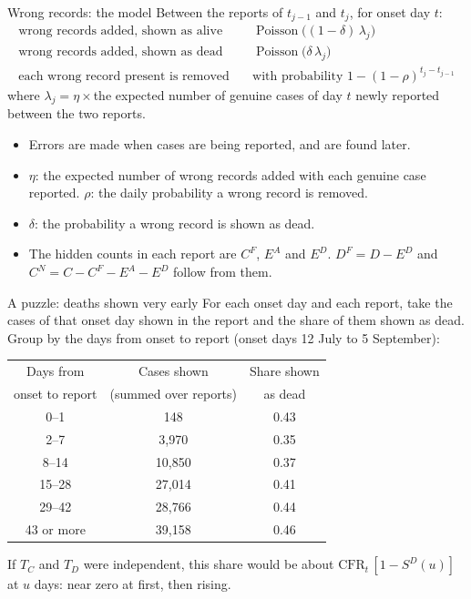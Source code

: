 \documentclass[aspectratio=169,9pt]{beamer}
\newcommand{\cfr}{\mathrm{CFR}}
\begin{document}
\begin{frame}{Wrong records: the model}
Between the reports of $t_{j-1}$ and $t_j$, for onset day $t$:
\begin{align*}
\text{wrong records added, shown as alive}\quad & \operatorname{Poisson}\bigl((1-\delta)\,\lambda_j\bigr)\\[3pt]
\text{wrong records added, shown as dead}\quad & \operatorname{Poisson}\bigl(\delta\,\lambda_j\bigr)\\[3pt]
\text{each wrong record present is removed}\quad & \text{with probability }1-(1-\rho)^{t_j-t_{j-1}}
\end{align*}
where $\lambda_j=\eta\times{}$the expected number of genuine cases of day $t$
newly reported between the two reports.

\bigskip
\begin{itemize}
\setlength{\itemsep}{0.6em}
\item Errors are made when cases are being reported, and are found later.
\item $\eta$: the expected number of wrong records added with each genuine
case reported. $\rho$: the daily probability a wrong record is removed.
\item $\delta$: the probability a wrong record is shown as dead.
\item The hidden counts in each report are $C^{F}$, $E^{A}$ and $E^{D}$.
$D^{F}=D-E^{D}$ and $C^{N}=C-C^{F}-E^{A}-E^{D}$ follow from them.
\end{itemize}
\end{frame}

\begin{frame}{A puzzle: deaths shown very early}
For each onset day and each report, take the cases of that onset day shown
in the report and the share of them shown as dead. Group by the days from
onset to report (onset days 12 July to 5 September):

\medskip
\begin{center}
\small
\renewcommand{\arraystretch}{1.15}
\begin{tabular}{ccc}
\toprule
Days from & Cases shown & Share shown \\
onset to report & (summed over reports) & as dead \\
\midrule
0--1 & 148 & 0.43 \\
2--7 & 3,970 & 0.35 \\
8--14 & 10,850 & 0.37 \\
15--28 & 27,014 & 0.41 \\
29--42 & 28,766 & 0.44 \\
43 or more & 39,158 & 0.46 \\
\bottomrule
\end{tabular}
\end{center}

If $T_C$ and $T_D$ were independent, this share would be about
$\cfr_t\,[1-S^{D}(u)]$ at $u$ days: near zero at first, then rising.
\end{frame}
\end{document}
